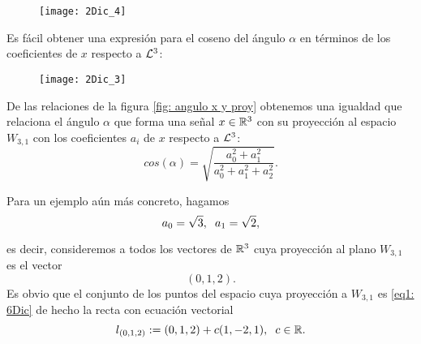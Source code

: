 \begin{ejemplo}
\begin{figure}[H]
	\centering
	\texttt{[image: 2Dic\_4]} 
\end{figure}

Es fácil obtener una expresión para el coseno del ángulo
$\alpha$ en términos de los coeficientes de $x$ respecto a $\mathcal{L}^{3}$:

\begin{figure}[H]
	\centering
	\texttt{[image: 2Dic\_3]}
\end{figure}


De las relaciones de la figura 
\ref{fig: angulo x y proy} 
obtenemos una igualdad que relaciona el ángulo 
$\alpha$ que forma una señal $x \in \mathbb{R}^{3}$ 
con su proyección al espacio $W_{3,1}$
con los coeficientes $a_{i}$
de $x$ respecto a $\mathcal{L}^{3}$:
\begin{equation}
\label{eq0: 3Dic}
cos(\alpha)= \sqrt{\frac{a_{0}^{2}+a_{1}^{2}}{a_{0}^{2}+a_{1}^{2}+a_{2}^{2}}}.
\end{equation}

Para un ejemplo aún más concreto, hagamos 
\begin{equation}
\label{eq1: 19Sept}
a_{0}= \sqrt{3}, \hspace{0.2cm} a_{1}= \sqrt{2},
\end{equation}


\noindent
es decir, consideremos a todos los vectores de $\mathbb{R}^{3}$
cuya proyección al plano $W_{3,1}$ es 
el vector
\begin{equation}
\label{eq1: 6Dic}
(0,1,2).
\end{equation}
Es obvio que el conjunto de los puntos
del espacio cuya proyección a
$W_{3,1}$ es \eqref{eq1: 6Dic} de hecho la recta
con ecuación vectorial
\begin{equation}
\label{eq0: 6Dic}
l_{(0,1,2)} := (0,1,2)+c(1,-2,1), \hspace{0.2cm} c \in \mathbb{R}.
\end{equation}


\end{ejemplo}
